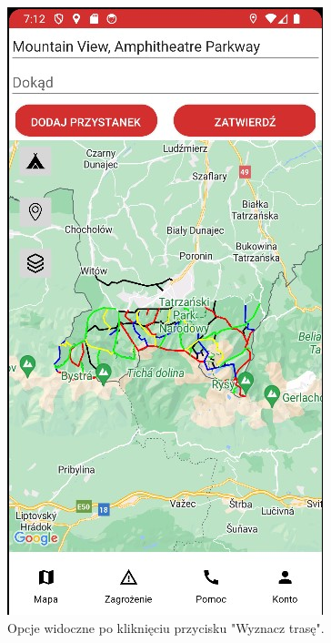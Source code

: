 \begin{figure}[H]
    \centering
    \includegraphics[scale=1.0]{img/test/testmap2.jpg}
    \caption{Opcje widoczne po kliknięciu przycisku "Wyznacz trasę".}
    \label{widok:wyznacztrase}
\end{figure}

